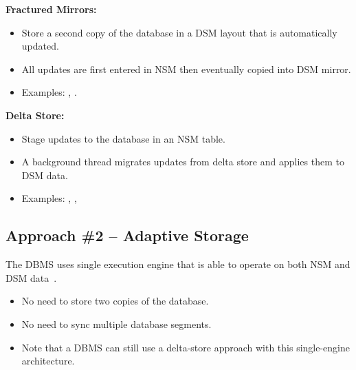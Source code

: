 \documentclass[11pt]{article}
\begin{document}
\textbf{Fractured Mirrors:}~\cite{p430-ramamurthy}
\begin{itemize}
    \item
    Store a second copy of the database in a DSM layout that is automatically updated.
    
    \item
    All updates are first entered in NSM then eventually copied into DSM mirror.
    
    \item
    Examples: , .
\end{itemize}

\textbf{Delta Store:}
\begin{itemize}
    \item
    Stage updates to the database in an NSM table.
    
    \item
    A background thread migrates updates from delta store and applies them to DSM data.
    
    \item
    Examples: , , 
\end{itemize}

\subsection{Approach \#2 -- Adaptive Storage}
The DBMS uses single execution engine that is able to operate on both NSM and DSM 
data~\cite{p583-arulraj}.

\begin{itemize}
    \item
    No need to store two copies of the database.
    
    \item
    No need to sync multiple database segments.
    
    \item
    Note that a DBMS can still use a delta-store approach with this single-engine architecture.
\end{itemize}

\newpage


\end{document}
